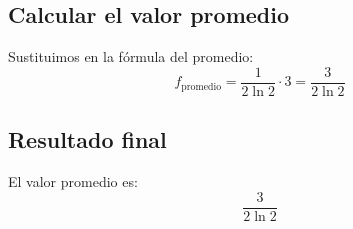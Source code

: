 \subsection*{Calcular el valor promedio}
Sustituimos en la fórmula del promedio:
\[
f_{\text{promedio}} = \frac{1}{2 \ln 2} \cdot 3 = \frac{3}{2 \ln 2}
\]

\subsection*{Resultado final}
El valor promedio es:
\[
\boxed{\frac{3}{2 \ln 2}}
\]
 \newpage 
